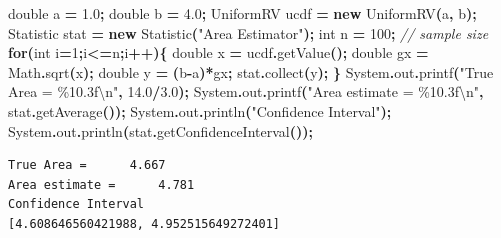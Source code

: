 \documentclass[
]{book}
\newenvironment{Shaded}{\begin{snugshade}}{\end{snugshade}}
\newcommand{\BuiltInTok}[1]{#1}
\newcommand{\CommentTok}[1]{\textcolor[rgb]{0.56,0.35,0.01}{\textit{#1}}}
\newcommand{\ControlFlowTok}[1]{\textcolor[rgb]{0.13,0.29,0.53}{\textbf{#1}}}
\newcommand{\DataTypeTok}[1]{\textcolor[rgb]{0.13,0.29,0.53}{#1}}
\newcommand{\DecValTok}[1]{\textcolor[rgb]{0.00,0.00,0.81}{#1}}
\newcommand{\FloatTok}[1]{\textcolor[rgb]{0.00,0.00,0.81}{#1}}
\newcommand{\FunctionTok}[1]{\textcolor[rgb]{0.00,0.00,0.00}{#1}}
\newcommand{\KeywordTok}[1]{\textcolor[rgb]{0.13,0.29,0.53}{\textbf{#1}}}
\newcommand{\NormalTok}[1]{#1}
\newcommand{\OperatorTok}[1]{\textcolor[rgb]{0.81,0.36,0.00}{\textbf{#1}}}
\newcommand{\SpecialCharTok}[1]{\textcolor[rgb]{0.00,0.00,0.00}{#1}}
\newcommand{\StringTok}[1]{\textcolor[rgb]{0.31,0.60,0.02}{#1}}
\theoremstyle{definition}
\theoremstyle{definition}
\theoremstyle{definition}
\theoremstyle{definition}
\theoremstyle{remark}
\begin{document}
\begin{Shaded}
\begin{Highlighting}[]
\DataTypeTok{double}\NormalTok{ a }\OperatorTok{=} \FloatTok{1.0}\OperatorTok{;}
\DataTypeTok{double}\NormalTok{ b }\OperatorTok{=} \FloatTok{4.0}\OperatorTok{;}
\NormalTok{UniformRV ucdf }\OperatorTok{=} \KeywordTok{new} \FunctionTok{UniformRV}\OperatorTok{(}\NormalTok{a}\OperatorTok{,}\NormalTok{ b}\OperatorTok{);}
\NormalTok{Statistic stat }\OperatorTok{=} \KeywordTok{new} \FunctionTok{Statistic}\OperatorTok{(}\StringTok{"Area Estimator"}\OperatorTok{);}
\DataTypeTok{int}\NormalTok{ n }\OperatorTok{=} \DecValTok{100}\OperatorTok{;} \CommentTok{// sample size}
\ControlFlowTok{for}\OperatorTok{(}\DataTypeTok{int}\NormalTok{ i}\OperatorTok{=}\DecValTok{1}\OperatorTok{;}\NormalTok{i}\OperatorTok{\textless{}=}\NormalTok{n}\OperatorTok{;}\NormalTok{i}\OperatorTok{++)\{}
    \DataTypeTok{double}\NormalTok{ x }\OperatorTok{=}\NormalTok{ ucdf}\OperatorTok{.}\FunctionTok{getValue}\OperatorTok{();}
    \DataTypeTok{double}\NormalTok{ gx }\OperatorTok{=} \BuiltInTok{Math}\OperatorTok{.}\FunctionTok{sqrt}\OperatorTok{(}\NormalTok{x}\OperatorTok{);}
    \DataTypeTok{double}\NormalTok{ y }\OperatorTok{=} \OperatorTok{(}\NormalTok{b}\OperatorTok{{-}}\NormalTok{a}\OperatorTok{)*}\NormalTok{gx}\OperatorTok{;}
\NormalTok{    stat}\OperatorTok{.}\FunctionTok{collect}\OperatorTok{(}\NormalTok{y}\OperatorTok{);}
\OperatorTok{\}}
\BuiltInTok{System}\OperatorTok{.}\FunctionTok{out}\OperatorTok{.}\FunctionTok{printf}\OperatorTok{(}\StringTok{"True Area = }\SpecialCharTok{\%10.3f\textbackslash{}n}\StringTok{"}\OperatorTok{,} \FloatTok{14.0}\OperatorTok{/}\FloatTok{3.0}\OperatorTok{);}
\BuiltInTok{System}\OperatorTok{.}\FunctionTok{out}\OperatorTok{.}\FunctionTok{printf}\OperatorTok{(}\StringTok{"Area estimate = }\SpecialCharTok{\%10.3f\textbackslash{}n}\StringTok{"}\OperatorTok{,}\NormalTok{ stat}\OperatorTok{.}\FunctionTok{getAverage}\OperatorTok{());}
\BuiltInTok{System}\OperatorTok{.}\FunctionTok{out}\OperatorTok{.}\FunctionTok{println}\OperatorTok{(}\StringTok{"Confidence Interval"}\OperatorTok{);}
\BuiltInTok{System}\OperatorTok{.}\FunctionTok{out}\OperatorTok{.}\FunctionTok{println}\OperatorTok{(}\NormalTok{stat}\OperatorTok{.}\FunctionTok{getConfidenceInterval}\OperatorTok{());}
\end{Highlighting}
\end{Shaded}

\begin{verbatim}
True Area =      4.667
Area estimate =      4.781
Confidence Interval
[4.608646560421988, 4.952515649272401]
\end{verbatim}
\end{document}
